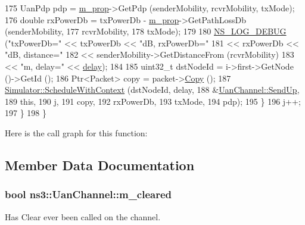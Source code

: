 \begin{DoxyCode}
175           UanPdp pdp = \hyperlink{classns3_1_1UanChannel_a630aeb5f0a32347fbde527697e879268}{m\_prop}->GetPdp (senderMobility, rcvrMobility, txMode);
176           \textcolor{keywordtype}{double} rxPowerDb = txPowerDb - \hyperlink{classns3_1_1UanChannel_a630aeb5f0a32347fbde527697e879268}{m\_prop}->GetPathLossDb (senderMobility,
177                                                                 rcvrMobility,
178                                                                 txMode);
179 
180           \hyperlink{group__logging_ga413f1886406d49f59a6a0a89b77b4d0a}{NS\_LOG\_DEBUG} (\textcolor{stringliteral}{"txPowerDb="} << txPowerDb << \textcolor{stringliteral}{"dB, rxPowerDb="}
181                                      << rxPowerDb << \textcolor{stringliteral}{"dB, distance="}
182                                      << senderMobility->GetDistanceFrom (rcvrMobility)
183                                      << \textcolor{stringliteral}{"m, delay="} << \hyperlink{lte_2model_2fading-traces_2fading__trace__generator_8m_a7964e6aa8f61a9d28973c8267a606ad8}{delay});
184 
185           uint32\_t dstNodeId = i->first->GetNode ()->GetId ();
186           Ptr<Packet> copy = packet->\hyperlink{classns3_1_1Packet_a5d5c70802a5f77fc5f0001e0cfc1898b}{Copy} ();
187           \hyperlink{classns3_1_1Simulator_a86dbaef45a15a42365d7d2ae550449f6}{Simulator::ScheduleWithContext} (dstNodeId, delay,
188                                           &\hyperlink{classns3_1_1UanChannel_af232fa9b7e8e9520a2d393149206c11a}{UanChannel::SendUp},
189                                           \textcolor{keyword}{this},
190                                           j,
191                                           copy,
192                                           rxPowerDb,
193                                           txMode,
194                                           pdp);
195         \}
196       j++;
197     \}
198 \}
\end{DoxyCode}


Here is the call graph for this function\+:




\subsection{Member Data Documentation}
\subsubsection[{\texorpdfstring{m\+\_\+cleared}{m_cleared}}]{\setlength{\rightskip}{0pt plus 5cm}bool ns3\+::\+Uan\+Channel\+::m\+\_\+cleared\hspace{0.3cm}{\ttfamily [private]}}\hypertarget{classns3_1_1UanChannel_abf640d5e1ca9a3e9c4476563ee91b7ce}{}\label{classns3_1_1UanChannel_abf640d5e1ca9a3e9c4476563ee91b7ce}
Has Clear ever been called on the channel. 
